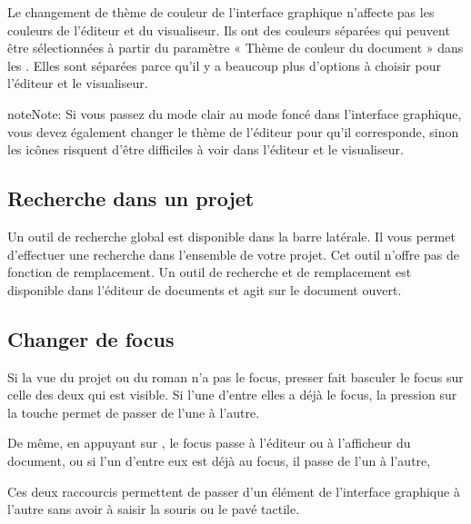 \documentclass[a4paper,11pt,french]{sphinxmanual}
\begin{document}
\sphinxAtStartPar
Le changement de thème de couleur de l’interface graphique n’affecte pas les couleurs de l’éditeur et du visualiseur. Ils ont des couleurs séparées qui peuvent être sélectionnées à partir du paramètre « Thème de couleur du document » dans les . Elles sont séparées parce qu’il y a beaucoup plus d’options à choisir pour l’éditeur et le visualiseur.

\begin{sphinxadmonition}{note}{Note:}
\sphinxAtStartPar
Si vous passez du mode clair au mode foncé dans l’interface graphique, vous devez également changer le thème de l’éditeur pour qu’il corresponde, sinon les icônes risquent d’être difficiles à voir dans l’éditeur et le visualiseur.
\end{sphinxadmonition}


\subsection{Recherche dans un projet}
\label{\detokenize{usage_breakdown:project-search}}
\sphinxAtStartPar
Un outil de recherche global est disponible dans la barre latérale. Il vous permet d’effectuer une recherche dans l’ensemble de votre projet. Cet outil n’offre pas de fonction de remplacement. Un outil de recherche et de remplacement est disponible dans l’éditeur de documents et agit sur le document ouvert.

\sphinxAtStartPar
{}


\subsection{Changer de focus}
\label{\detokenize{usage_breakdown:switching-focus}}
\sphinxAtStartPar
Si la vue du projet ou du roman n’a pas le focus, presser  fait basculer le focus sur celle des deux qui est visible. Si l’une d’entre elles a déjà le focus, la pression sur la touche permet de passer de l’une à l’autre.

\sphinxAtStartPar
De même, en appuyant sur , le focus passe à l’éditeur ou à l’afficheur du document, ou si l’un d’entre eux est déjà au focus, il passe de l’un à l’autre,

\sphinxAtStartPar
Ces deux raccourcis permettent de passer d’un élément de l’interface graphique à l’autre sans avoir à saisir la souris ou le pavé tactile.
\end{document}
